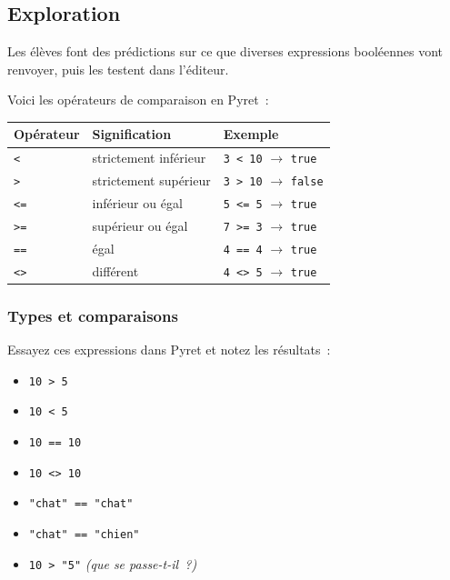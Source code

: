 \documentclass[12pt,a4paper]{article}
\newcommand{\pyret}[1]{\texttt{#1}}
\begin{document}
\subsection{Exploration}

Les élèves font des prédictions sur ce que diverses expressions booléennes vont renvoyer, puis les testent dans l'éditeur.

\begin{codeexample}
  Voici les opérateurs de comparaison en Pyret~:

  \begin{center}
  \begin{tabular}{lll}
    \toprule
    \textbf{Opérateur} & \textbf{Signification} & \textbf{Exemple} \\
    \midrule
    \pyret{<}  & strictement inférieur  & \pyret{3 < 10} $\rightarrow$ \texttt{true} \\
    \pyret{>}  & strictement supérieur  & \pyret{3 > 10} $\rightarrow$ \texttt{false} \\
    \pyret{<=} & inférieur ou égal      & \pyret{5 <= 5} $\rightarrow$ \texttt{true} \\
    \pyret{>=} & supérieur ou égal      & \pyret{7 >= 3} $\rightarrow$ \texttt{true} \\
    \pyret{==} & égal                   & \pyret{4 == 4} $\rightarrow$ \texttt{true} \\
    \pyret{<>} & différent              & \pyret{4 <> 5} $\rightarrow$ \texttt{true} \\
    \bottomrule
  \end{tabular}
  \end{center}
\end{codeexample}

\subsubsection{Types et comparaisons}

\begin{activitybox}
  Essayez ces expressions dans Pyret et notez les résultats~:

  \begin{itemize}[leftmargin=*]
    \item \pyret{10 > 5}
    \item \pyret{10 < 5}
    \item \pyret{10 == 10}
    \item \pyret{10 <> 10}
    \item \pyret{"chat" == "chat"}
    \item \pyret{"chat" == "chien"}
    \item \pyret{10 > "5"} \hspace{2em} \textit{(que se passe-t-il~?)}
  \end{itemize}
\end{activitybox}
\end{document}
